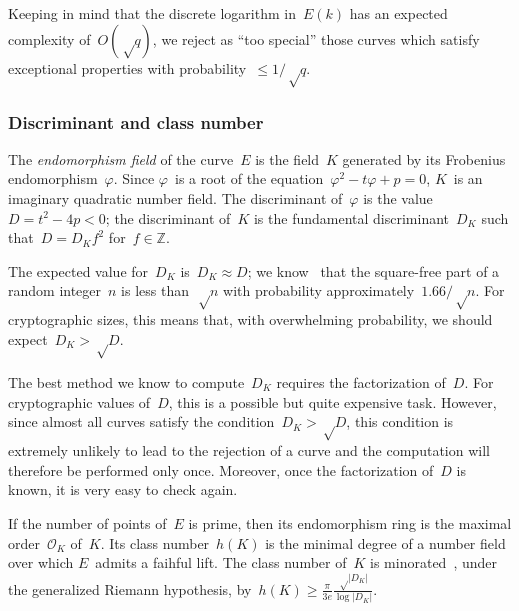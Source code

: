 \documentclass{article}
\let\ro\mathcal
\def\abs#1{\left|#1\right|}
\def\pa#1{\left(#1\right)}
\begin{document}
Keeping in mind that the discrete logarithm in~$E(k)$
has an expected complexity of~$O(√q)$,
we reject as ``too special'' those curves
which satisfy exceptional properties with probability~$≤ 1/√q$.

\subsubsection{Discriminant and class number}
\label{sss:class}

The \emph{endomorphism field} of the curve~$E$
is the field~$K$ generated by its Frobenius endomorphism~$φ$.
Since $φ$~is a root of the equation~$φ^2 - t φ + p = 0$,
$K$~is an imaginary quadratic number field.
The discriminant of~$φ$ is the value~$D = t^2 - 4 p < 0$;
the discriminant of~$K$ is the fundamental discriminant~$D_K$
such that~$D = D_K f^2$ for~$f ∈ ℤ$.

The expected value for~$D_K$ is~$D_K ≈ D$;
we know~\cite{jis2014cdkd} that the square-free part of
a random integer~$n$ is less than~$√n$
with probability approximately~$1.66/√n$.
For cryptographic sizes, this means that,
with overwhelming probability, we should expect~$D_K > √D$.

The best method we know to compute~$D_K$ requires the
factorization of~$D$.
For cryptographic values of~$D$, this is a possible but
quite expensive task.
However, since almost all curves satisfy the condition~$D_K > √D$,
this condition is extremely unlikely to lead to the rejection of a curve
and the computation will therefore be performed only once.
Moreover, once the factorization of~$D$ is known,
it is very easy to check again.

\medbreak

If the number of points of~$E$ is prime,
then its endomorphism ring is the maximal order~$\ro O_K$ of~$K$.
Its class number~$h(K)$ is the minimal degree
of a number field over which $E$~admits a faihful lift.
The class number of~$K$ is minorated~\cite{cras1990louboutin},
under the generalized Riemann hypothesis,
by~$h(K) ≥ \frac{π}{3e} \frac{√{\abs{D_K}}}{\log \abs{D_K}}$.
\end{document}
